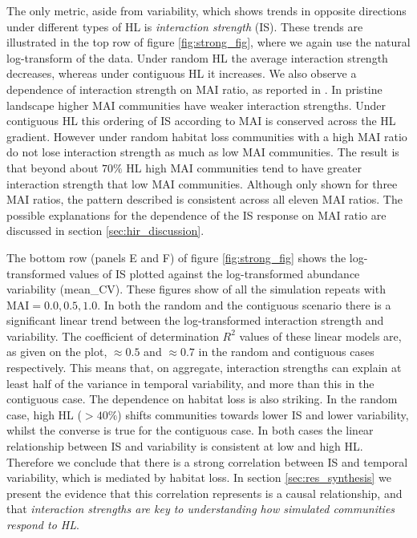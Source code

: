 The only metric, aside from variability, which shows trends in opposite directions under different types of HL is \emph{interaction strength} (IS). These trends are illustrated in the top row of figure \ref{fig:strong_fig}, where we again use the natural log-transform of the data. Under random HL the average interaction strength decreases, whereas under contiguous HL it increases. We also observe a dependence of interaction strength on MAI ratio, as reported in \cite{lurgi2015effects}. In pristine landscape higher MAI communities have weaker interaction strengths. Under contiguous HL this ordering of IS according to MAI is conserved across the HL gradient. However under random habitat loss communities with a high MAI ratio do not lose interaction strength as much as low MAI communities. The result is that beyond about $70\%$ HL high MAI communities tend to have greater interaction strength that low MAI communities. Although only shown for three MAI ratios, the pattern described is consistent across all eleven MAI ratios. The possible explanations for the dependence of the IS response on MAI ratio are discussed in section \ref{sec:hir_discussion}.

The bottom row (panels E and F) of figure \ref{fig:strong_fig} shows the log-transformed values of IS plotted against the log-transformed abundance variability (mean\_CV). These figures show of all the simulation repeats with MAI$=0.0,0.5,1.0$. In both the random and the contiguous scenario there is a significant linear trend between the log-transformed interaction strength and variability. The coefficient of determination $R^2$ values of these linear models are, as given on the plot, $\approx 0.5$ and $\approx 0.7$ in the random and contiguous cases respectively. This means that, on aggregate, interaction strengths can explain at least half of the variance in temporal variability, and more than this in the contiguous case. The dependence on habitat loss is also striking. In the random case, high HL ($>40\%$) shifts communities towards lower IS and lower variability, whilst the converse is true for the contiguous case. In both cases the linear relationship between IS and variability is consistent at low and high HL. Therefore we conclude that there is a strong correlation between IS and temporal variability, which is mediated by habitat loss. In section \ref{sec:res_synthesis} we present the evidence that this correlation represents is a causal relationship, and that \emph{interaction strengths are key to understanding how simulated communities respond to HL}.   

